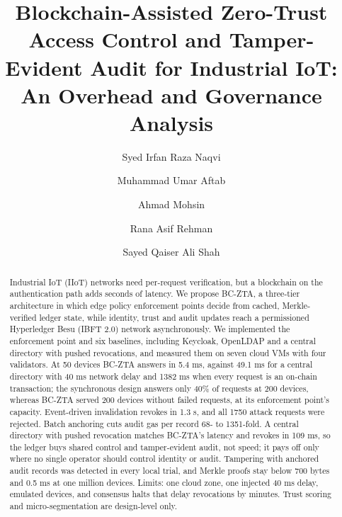 \documentclass[a4paper,5p,times,twocolumn,number,sort&compress]{elsarticle}
\begin{document}
\begin{frontmatter}

\title{Blockchain-Assisted Zero-Trust Access Control and Tamper-Evident Audit for Industrial IoT: An Overhead and Governance Analysis}

\author[a]{Syed Irfan Raza Naqvi}
\author[b]{Muhammad Umar Aftab}
\author[c]{Ahmad Mohsin}
\author[d]{Rana Asif Rehman}
\author[e]{Sayed Qaiser Ali Shah}

\address[a]{FAST School of Computing, Department of Computer Science, National University of Computer and Emerging Sciences (FAST-NUCES), 852-B Milaad Street, Block B, Faisal Town, Lahore 54770, Pakistan}
\address[b]{Department of Computer Science, National University of Computer and Emerging Sciences (FAST-NUCES), Chiniot-Faisalabad Campus, FAST Square, Chiniot 38000, Pakistan}
\address[c]{School of Science, Edith Cowan University, 270 Joondalup Drive, Joondalup WA 6027, Australia}
\address[d]{Faculty of Engineering and Technology, Muscat University, Building 2089, Al Ghubra North, P.O. Box 550, PC 130, Muscat, Oman}
\address[e]{Department of Computer Science, Faculty of Computing and Information Technology, International Islamic University, New Campus, Sector H-10, Islamabad 44000, Pakistan}

\begin{abstract}
Industrial IoT (IIoT) networks need per-request verification, but a blockchain on the authentication path adds seconds of latency. We propose BC-ZTA, a three-tier architecture in which edge policy enforcement points decide from cached, Merkle-verified ledger state, while identity, trust and audit updates reach a permissioned Hyperledger Besu (IBFT 2.0) network asynchronously. We implemented the enforcement point and six baselines, including Keycloak, OpenLDAP and a central directory with pushed revocations, and measured them on seven cloud VMs with four validators. At 50 devices BC-ZTA answers in 5.4 ms, against 49.1 ms for a central directory with 40 ms network delay and 1382 ms when every request is an on-chain transaction; the synchronous design answers only 40\% of requests at 200 devices, whereas BC-ZTA served 200 devices without failed requests, at its enforcement point's capacity. Event-driven invalidation revokes in 1.3 s, and all 1750 attack requests were rejected. Batch anchoring cuts audit gas per record 68- to 1351-fold. A central directory with pushed revocation matches BC-ZTA's latency and revokes in 109 ms, so the ledger buys shared control and tamper-evident audit, not speed; it pays off only where no single operator should control identity or audit. Tampering with anchored audit records was detected in every local trial, and Merkle proofs stay below 700 bytes and 0.5 ms at one million devices. Limits: one cloud zone, one injected 40 ms delay, emulated devices, and consensus halts that delay revocations by minutes. Trust scoring and micro-segmentation are design-level only.
\end{abstract}


\end{frontmatter}
\end{document}
